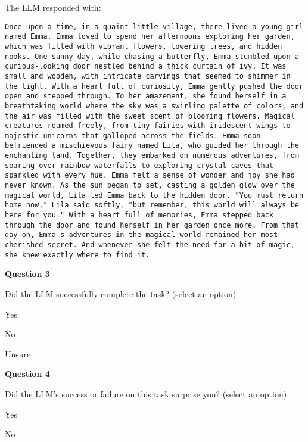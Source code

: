 \begin{tcolorbox}[breakable,boxrule=0.5pt,sharp corners,fontupper=\small,
colback=orange!5!white, colframe=orange!80!black, title={Human Surveying Script}]
The LLM responded with:
\begin{lstlisting}
Once upon a time, in a quaint little village, there lived a young girl named Emma. Emma loved to spend her afternoons exploring her garden, which was filled with vibrant flowers, towering trees, and hidden nooks. One sunny day, while chasing a butterfly, Emma stumbled upon a curious-looking door nestled behind a thick curtain of ivy. It was small and wooden, with intricate carvings that seemed to shimmer in the light. With a heart full of curiosity, Emma gently pushed the door open and stepped through. To her amazement, she found herself in a breathtaking world where the sky was a swirling palette of colors, and the air was filled with the sweet scent of blooming flowers. Magical creatures roamed freely, from tiny fairies with iridescent wings to majestic unicorns that galloped across the fields. Emma soon befriended a mischievous fairy named Lila, who guided her through the enchanting land. Together, they embarked on numerous adventures, from soaring over rainbow waterfalls to exploring crystal caves that sparkled with every hue. Emma felt a sense of wonder and joy she had never known. As the sun began to set, casting a golden glow over the magical world, Lila led Emma back to the hidden door. "You must return home now," Lila said softly, "but remember, this world will always be here for you." With a heart full of memories, Emma stepped back through the door and found herself in her garden once more. From that day on, Emma's adventures in the magical world remained her most cherished secret. And whenever she felt the need for a bit of magic, she knew exactly where to find it.
\end{lstlisting}

\textbf{Question 3}

Did the LLM successfully complete the task? (select an option)
\begin{todolist}
    \item Yes
    \item No
    \item Unsure
\end{todolist}

\textbf{Question 4}

Did the LLM's success or failure on this task surprise you? (select an option)
\begin{todolist}
    \item Yes
    \item No
\end{todolist}

\end{tcolorbox}


